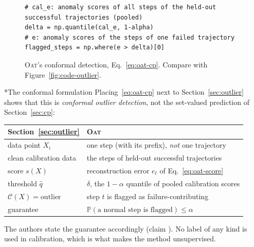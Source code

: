 \documentclass[11pt]{article}
\makeatletter
\theoremstyle{definition}
\renewcommand\subsection{\@startsection{subsection}{2}{\z@}{-3.25ex\@plus -1ex \@minus -.2ex}{1.5ex \@plus .2ex}{\normalfont\large\bfseries\color{secblue}}}
\newcommand{\C}{\mathcal{C}}
\newcommand{\qhat}{\hat{q}}
\newcommand{\PP}{\mathbb{P}}
\makeatother
\begin{document}
\begin{figure}[H]
\begin{snugshade}
\begin{Verbatim}
# cal_e: anomaly scores of all steps of the held-out successful trajectories (pooled)
delta = np.quantile(cal_e, 1-alpha)
# e: anomaly scores of the steps of one failed trajectory
flagged_steps = np.where(e > delta)[0]
\end{Verbatim}
\end{snugshade}
\caption{\textsc{Oat}'s conformal detection, Eq.~\eqref{eq:oat-cp}. Compare with Figure~\ref{fig:code-outlier}.}
\label{fig:code-oat}
\end{figure}

\subsection*{The conformal formulation}
Placing~\eqref{eq:oat-cp} next to Section~\ref{sec:outlier} shows that this is \emph{conformal outlier detection}, not the set-valued prediction of Section~\ref{sec:cp}:
\begin{center}\small
\begin{tabular}{@{}ll@{}}\toprule
Section~\ref{sec:outlier} & \textsc{Oat}\\\midrule
data point $X_i$ & one step (with its prefix), \emph{not} one trajectory\\
clean calibration data & the steps of held-out successful trajectories\\
score $s(X)$ & reconstruction error $e_t$ of Eq.~\eqref{eq:oat-score}\\
threshold $\qhat$ & $\delta$, the $1-\alpha$ quantile of pooled calibration scores\\
$\C(X)=\text{outlier}$ & step $t$ is flagged as failure-contributing\\
guarantee & $\PP(\text{a normal step is flagged})\le\alpha$\\\bottomrule
\end{tabular}
\end{center}
The authors state the guarantee accordingly (claim ). No label of any kind is used in calibration, which is what makes the method unsupervised.
\end{document}

